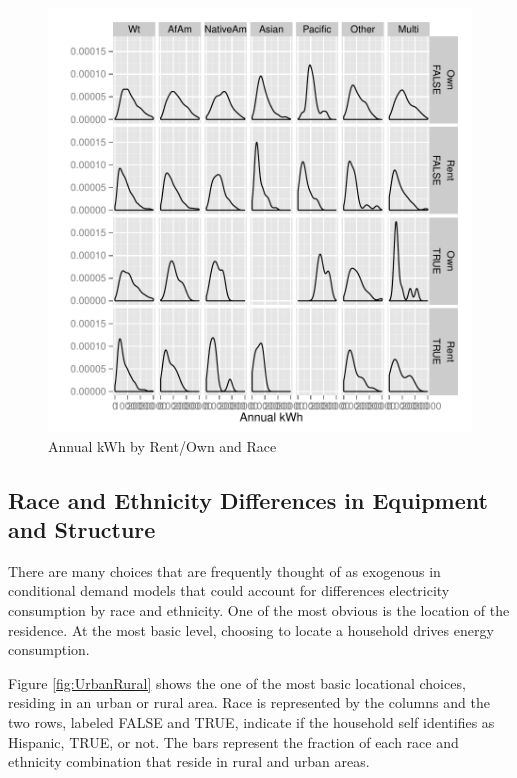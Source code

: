 \documentclass{article}
\begin{document}
\begin{figure}[htbp]
\begin{center}
\caption{Annual kWh by Rent/Own and Race}
\label{fig:kWhbyOwnRace}
\includegraphics{DraftEdwardsWoods-005}
\end{center}
\end{figure}


  \subsection{Race and Ethnicity Differences in Equipment and Structure}

There are many choices that are frequently thought of as exogenous in conditional demand models that could account for differences electricity consumption by race and ethnicity.  One of the most obvious is the location of the residence.  At the most basic level, choosing to locate a household drives energy consumption.  

Figure 
\ref{fig:UrbanRural}
shows the one of the most basic locational choices, residing in an urban or rural area.  Race is represented by the columns and the two rows, labeled FALSE and TRUE, indicate if the household self identifies as Hispanic, TRUE, or not.  The bars represent the fraction of each race and ethnicity combination that reside in rural and urban areas.
\end{document}
